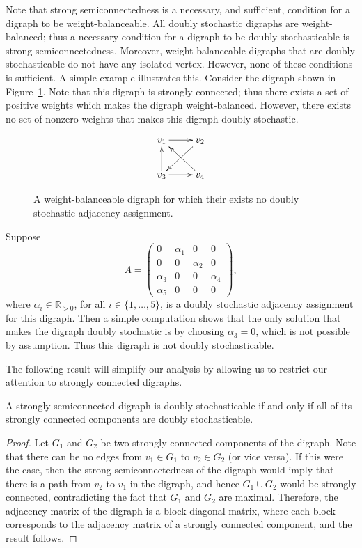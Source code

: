 \documentclass[final]{siamltex}
\begin{document}
Note that strong semiconnectedness is a necessary, and sufficient,
condition for a digraph to be weight-balanceable. All doubly
stochastic digraphs are weight-balanced; thus a necessary condition
for a digraph to be doubly stochasticable is strong
semiconnectedness. Moreover, weight-balanceable digraphs that are
doubly stochasticable do not have any isolated vertex.  However, none
of these conditions is sufficient.  A simple example illustrates
this. Consider the digraph shown in
Figure~\ref{fig:ds_digraph_ex1}. Note that this digraph is strongly
connected; thus there exists a set of positive weights which makes the
digraph weight-balanced.  However, there exists no set of nonzero
weights that makes this digraph doubly stochastic.
\begin{figure}
  \[
  \xymatrix{v_1 \ar[r] & v_2 \ar[dl]\\
    v_3 \ar[u] \ar[r] & v_4 \ar[lu] }
  \]
  \caption{A weight-balanceable digraph for which their exists no
    doubly stochastic adjacency assignment.}
  \label{fig:ds_digraph_ex1}
\end{figure}
Suppose
\[
A=\left(\begin{array}{cccc}0 & \alpha_1 & 0 &0\\
    0 & 0 & \alpha_2 & 0\\
    \alpha_3 & 0 & 0 & \alpha_4\\
    \alpha_5 & 0 & 0 & 0
  \end{array}\right), 
\]
where $ \alpha_i \in \mathbb{R}_{>0} $, for all $ i\in\{1,\ldots, 5\}
$, is a doubly stochastic adjacency assignment for this digraph. Then
a simple computation shows that the only solution that makes the
digraph doubly stochastic is by choosing $ \alpha_3=0 $, which is not
possible by assumption. Thus this digraph is not doubly
stochasticable. 

The following result will simplify our analysis by allowing us to
restrict our attention to strongly connected digraphs.

\begin{lemma}\label{le:decomp}
  A strongly semiconnected digraph is doubly stochasticable if and
  only if all of its strongly connected components are doubly
  stochasticable.
\end{lemma}

\begin{proof}
  Let $G_1$ and $G_2$ be two strongly connected components of the
  digraph. Note that there can be no edges from $v_1 \in G_1$ to $v_2
  \in G_2$ (or vice versa). If this were the case, then the strong
  semiconnectedness of the digraph would imply that there is a path
  from $v_2$ to $v_1$ in the digraph, and hence $G_1 \cup G_2$ would
  be strongly connected, contradicting the fact that $G_1$ and $G_2$
  are maximal.  Therefore, the adjacency matrix of the digraph is a
  block-diagonal matrix, where each block corresponds to the adjacency
  matrix of a strongly connected component, and the result follows.
\end{proof}
\end{document}
